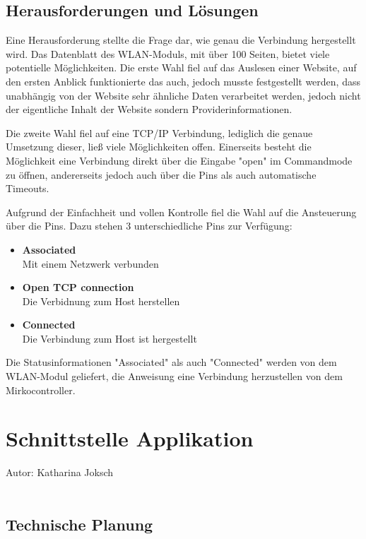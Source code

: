   \subsection{Herausforderungen und Lösungen}
  Eine Herausforderung stellte die Frage dar, wie genau die Verbindung hergestellt wird. Das Datenblatt des WLAN-Moduls, mit über 100 Seiten, bietet viele potentielle Möglichkeiten.
  Die erste Wahl fiel auf das Auslesen einer Website, auf den ersten Anblick funktionierte das auch, jedoch musste festgestellt werden, dass unabhängig von der Website sehr ähnliche
  Daten verarbeitet werden, jedoch nicht der eigentliche Inhalt der Website sondern Providerinformationen.

  Die zweite Wahl fiel auf eine TCP/IP Verbindung, lediglich die genaue Umsetzung dieser, ließ viele Möglichkeiten offen. Einerseits besteht die Möglichkeit eine Verbindung direkt
  über die Eingabe "open" im Commandmode zu öffnen, andererseits jedoch auch über die Pins als auch automatische Timeouts.

  Aufgrund der Einfachheit und vollen Kontrolle fiel die Wahl auf die Ansteuerung über die Pins.
  Dazu stehen 3 unterschiedliche Pins zur Verfügung:
  \begin{itemize}
    \item \textbf{Associated}\\
    Mit einem Netzwerk verbunden
    \item \textbf{Open TCP connection}\\
    Die Verbidnung zum Host herstellen
    \item \textbf{Connected}\\
    Die Verbindung zum Host ist hergestellt
  \end{itemize}
  Die Statusinformationen "Associated" als auch "Connected" werden von dem WLAN-Modul geliefert, die Anweisung eine Verbindung herzustellen von dem Mirkocontroller.

\pagebreak
\section{Schnittstelle Applikation}
Autor: Katharina Joksch\\ \\

  \subsection{Technische Planung}

